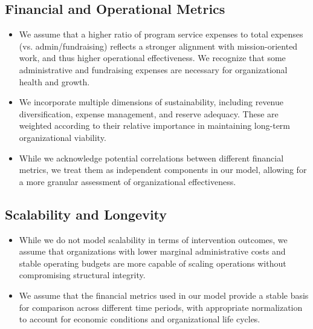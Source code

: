 \documentclass[12pt]{article}
\begin{document}
\subsection*{Financial and Operational Metrics}
\begin{itemize}
    \item We assume that a higher ratio of program service expenses to total expenses (vs. admin/fundraising) reflects a stronger alignment with mission-oriented work, and thus higher operational effectiveness. We recognize that some administrative and fundraising expenses are necessary for organizational health and growth.
    
    \item We incorporate multiple dimensions of sustainability, including revenue diversification, expense management, and reserve adequacy. These are weighted according to their relative importance in maintaining long-term organizational viability.
    
    \item While we acknowledge potential correlations between different financial metrics, we treat them as independent components in our model, allowing for a more granular assessment of organizational effectiveness.
\end{itemize}

\subsection*{Scalability and Longevity}
\begin{itemize}
    \item While we do not model scalability in terms of intervention outcomes, we assume that organizations with lower marginal administrative costs and stable operating budgets are more capable of scaling operations without compromising structural integrity.
    
    \item We assume that the financial metrics used in our model provide a stable basis for comparison across different time periods, with appropriate normalization to account for economic conditions and organizational life cycles.
\end{itemize}
\end{document}
